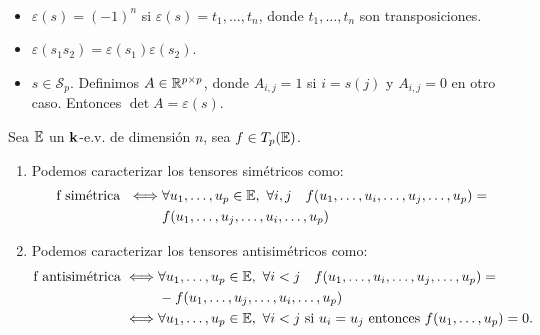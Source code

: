 \begin{obs}~
    \begin{itemize}
        \item $\varepsilon (s) = (-1)^n$ si $\varepsilon (s) = t_1, \dots , t_n$, donde 
        $t_1,\dots,t_n$ son transposiciones.
        \item $\varepsilon (s_1 s_2) = \varepsilon (s_1) \varepsilon(s_2)$.
        \item $s \in \mathcal{S}_p$. Definimos $A \in \mathbb{R} ^{p\times p}$, donde
        $A_{i,j} = 1$ si $i = s(j)$ y $A_{i,j} = 0$ en otro caso. Entonces
        $\det A = \varepsilon(s)$.       
    \end{itemize}
\end{obs}
\begin{prop}\label{prop:sim_comp}
    Sea $\mathbb{E}$ un $\mathbf{k}$-e.v. de dimensión $n$, sea $f \in T_p(\mathbb{E})$.
    \begin{enumerate}
        \item Podemos caracterizar los tensores simétricos como:
        \[
        \begin{split}\text{f simétrica } \iff &
        \forall u_1,\dots,u_p \in \mathbb{E}, \  \forall i,j \quad 
        f(u_1,\dots,u_i,\dots,u_j,\dots,u_p) = \\ 
        &f(u_1,\dots,u_j,\dots,u_i,\dots,u_p)
        \end{split}
        \]
        \item Podemos caracterizar los tensores antisimétricos como: 
        \[
        \begin{split}\text{f antisimétrica} \iff & 
        \forall u_1,\dots,u_p \in \mathbb{E}, \  \forall i < j \quad
        f(u_1,\dots,u_i,\dots,u_j,\dots,u_p) = \\ 
        &-f(u_1,\dots,u_j,\dots,u_i,\dots,u_p)\\
        \iff& \forall u_1,\dots,u_p \in \mathbb{E}, \ \forall i < j \text{ si } u_i=u_j 
        \text{ entonces } f(u_1,\dots,u_p) = 0.
        \end{split}\]
    \end{enumerate}
\end{prop}
